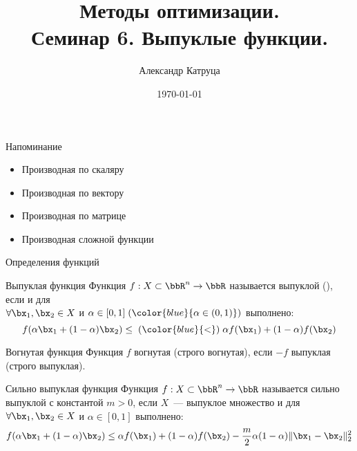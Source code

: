 \documentclass[12pt]{beamer}
\title[Семинар 6]{Методы оптимизации. \\
 Семинар 6. Выпуклые функции.}
\author{Александр Катруца}
\institute{Московский физико-технический институт,\\
Факультет Управления и Прикладной Математики}
\date{\today}
\begin{document}
\begin{frame}
\maketitle
\end{frame}

\begin{frame}{Напоминание}
\begin{itemize}
\item Производная по скаляру
\item Производная по вектору
\item Производная по матрице
\item Производная сложной функции
\end{itemize}
\end{frame}

\begin{frame}{Определения функций}
\small
\begin{block}{Выпуклая функция}
Функция $f: X \subset \bbR^n \rightarrow \bbR$ называется выпуклой ({\color{blue}{строго выпуклой}}), если {\color{red}{$X$~--- выпуклое множество}} и для \\ 
$\forall \bx_1, \bx_2 \in X$ и $\alpha \in [0, 1] \; ({\color{blue}{\alpha \in (0, 1)}})$  выполнено:
\vspace{-4mm}
\[
f(\alpha \bx_1 + (1 - \alpha)\bx_2) \leq \; ({\color{blue}{<}}) \; \alpha f(\bx_1) + (1 - \alpha)f(\bx_2)
\]
\end{block} 

\begin{block}{Вогнутая функция}
Функция $f$ вогнутая (строго вогнутая), если $-f$ выпуклая (строго выпуклая).
\end{block}

\begin{block}{Сильно выпуклая функция}
Функция $f: X \subset \bbR^n \rightarrow \bbR$ называется сильно  выпуклой с константой $m > 0$, если $X$~--- выпуклое множество и для $\forall \bx_1, \bx_2 \in X$ и $\alpha \in [0, 1]$  выполнено:
\vspace{-4mm}
\[
f(\alpha \bx_1 + (1 - \alpha)\bx_2) \leq \alpha f(\bx_1) + (1 - \alpha)f(\bx_2) - \frac{m}{2} \alpha (1 - \alpha) \| \bx_1 - \bx_2 \|_2^2
\]
\end{block}

\end{frame}
\end{document}
